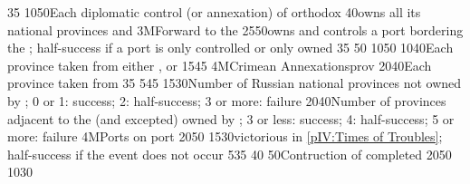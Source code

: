 %
%
{}{35}{}%
%
%
%
{10}{50}{Each diplomatic control (or annexation) of orthodox \MIN}%
%
%
{}{40}{\paysmajeurRussie owns all its national provinces and
  \provinceSmolenska}%
%
\EUobjective3M{Forward to the \regionBaltique}{}%
{25}{50}{\paysmajeurRussie owns and controls a port bordering the
  \regionBaltique; half-success if a port is only controlled or only owned}%
%
%
{}{35}{}%
%
%
{}{50}{}%
%
%
%
{10}{50}{}%
%
%
%
{10}{40}{Each province taken from either \paysmajeurPologne,
  \paysmajeurLithuanie or \paysukraine}%
%
%
{15}{45}{}%
%
\EUobjective4M{Crimean Annexations}{prov}%
{20}{40}{Each province taken from \paysCrimee}%
%
%
{}{35}{}%
%
%
%
{5}{45}{}%
%
%
{15}{30}{Number of Russian national provinces not owned by \paysmajeurRussie;
  0 or 1: success; 2: half-success; 3 or more: failure}%
%
%
{20}{40}{Number of provinces adjacent to the \regionBaltique (\regionSuede and
  \regionFinlande excepted) owned by \paysmajeurSuede; 3 or less: success; 4:
  half-success; 5 or more: failure}%
%
%
\EUobjective4M{Ports on \regionNoire}{port}%
{20}{50}{}%
%
{15}{30}{\RUS victorious in \ref{pIV:Times of Troubles}; half-success if the
  event does not occur}%
%
%
%
{5}{35}{}%
%
%
{}{40}{}%
%
%
{}{50}{Contruction of  completed}%
%
%
{20}{50}{}%
%
%
{10}{30}{}%

